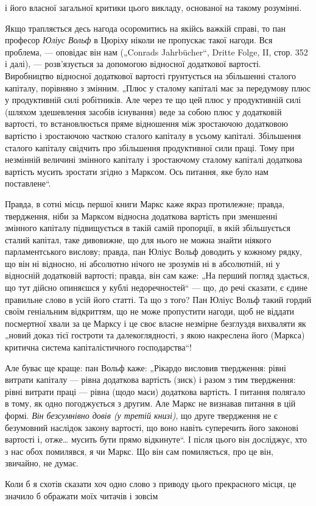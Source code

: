 \parcont{}  %
і його власної загальної критики цього викладу, основаної на
такому розумінні.

Якщо трапляється десь нагода осоромитись на якійсь важкій
справі, то пан професор \emph{Юліус Вольф} в Цюріху ніколи не пропускає
такої нагоди. Вся проблема, — оповідає він нам („Conrads
Jahrbücher“, Dritte Folge, II, стор. 352 і далі), — розв’язується за допомогою
відносної додаткової вартості. Виробництво відносної
додаткової вартості грунтується на збільшенні сталого капіталу,
порівняно з змінним. „Плюс у сталому капіталі має за передумову
плюс у продуктивній силі робітників. Але через те що цей
плюс у продуктивній силі (шляхом здешевлення засобів існування)
веде за собою плюс у додатковій вартості, то встановлюється
пряме відношення між зростаючою додатковою вартістю
і зростаючою часткою сталого капіталу в усьому капіталі.
Збільшення сталого капіталу свідчить про збільшення
продуктивної сили праці. Тому при незмінній величині змінного
капіталу і зростаючому сталому капіталі додаткова вартість
мусить зростати згідно з Марксом. Ось питання, яке було нам
поставлене“.

Правда, в сотні місць першої книги Маркс каже якраз протилежне;
правда, твердження, ніби за Марксом відносна додаткова
вартість при зменшенні змінного капіталу підвищується в такій
самій пропорції, в якій збільшується сталий капітал, таке дивовижне,
що для нього не можна знайти ніякого парламентського
вислову; правда, пан Юліус Вольф доводить у кожному рядку,
що він ні відносно, ні абсолютно нічого не зрозумів ні в абсолютній,
ні у відносній додатковій вартості; правда, він сам
каже: „На перший погляд здається, що тут дійсно опиняєшся
у кублі недоречностей“ — що, до речі сказати, є єдине правильне
слово в усій його статті. Та що з того? Пан Юліус
Вольф такий гордий своїм геніальним відкриттям, що не може
пропустити нагоди, щоб не віддати посмертної хвали за це
Марксу і це своє власне незмірне безглуздя вихваляти як „новий
доказ тієї гостроти та далекоглядності, з якою накреслена
його (Маркса) критична система капіталістичного господарства“!

Але буває ще краще: пан Вольф каже: „Рікардо висловив
твердження: рівні витрати капіталу — рівна додаткова вартість
(зиск) і разом з тим твердження: рівні витрати праці — рівна
(щодо маси) додаткова вартість. І питання полягало в тому,
як одно погоджується з другим. Але Маркс не визнавав питання
в цій формі. \emph{Він безсумнівно довів (у третій книзі)},
що друге твердження не є безумовний наслідок закону вартості,
що воно навіть суперечить його законові вартості і, отже\dots{}
мусить бути прямо відкинуте“. І після цього він досліджує, хто
з нас обох помилявся, я чи Маркс. Що він сам помиляється,
про це він, звичайно, не думає.

Коли б я схотів сказати хоч одно слово з приводу цього
прекрасного місця, це значило б ображати моїх читачів і зовсім
\parbreak{}  %
